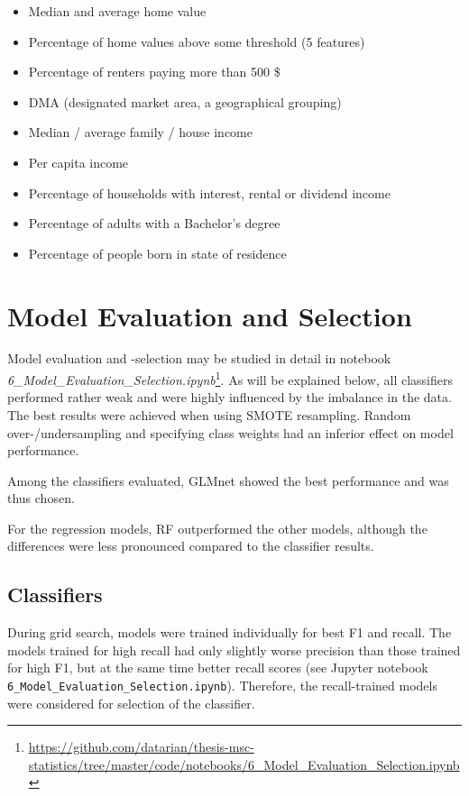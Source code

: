 \documentclass[
  11pt,
  a4paper,
  DIV=12,captions=tableheading,oneside,titlepage]{scrbook}
\providecommand{\tightlist}{%
  \setlength{\itemsep}{0pt}\setlength{\parskip}{0pt}}
\begin{document}
\begin{itemize}
\tightlist
\item
  Median and average home value
\item
  Percentage of home values above some threshold (5 features)
\item
  Percentage of renters paying more than 500 \$
\item
  DMA (designated market area, a geographical grouping)
\item
  Median / average family / house income
\item
  Per capita income
\item
  Percentage of households with interest, rental or dividend income
\item
  Percentage of adults with a Bachelor's degree
\item
  Percentage of people born in state of residence
\end{itemize}

\hypertarget{results-models}{%
\section{Model Evaluation and Selection}\label{results-models}}

Model evaluation and -selection may be studied in detail in notebook ~ \emph{6\_Model\_Evaluation\_Selection.ipynb}\footnote{\url{https://github.com/datarian/thesis-msc-statistics/tree/master/code/notebooks/6_Model_Evaluation_Selection.ipynb}}. As will be explained below, all classifiers performed rather weak and were highly influenced by the imbalance in the data. The best results were achieved when using SMOTE resampling. Random over-/undersampling and specifying class weights had an inferior effect on model performance.

Among the classifiers evaluated, GLMnet showed the best performance and was thus chosen.

For the regression models, RF outperformed the other models, although the differences were less pronounced compared to the classifier results.

\hypertarget{classifiers-1}{%
\subsection{Classifiers}\label{classifiers-1}}

During grid search, models were trained individually for best F1 and recall. The models trained for high recall had only slightly worse precision than those trained for high F1, but at the same time better recall scores (see Jupyter notebook \texttt{6\_Model\_Evaluation\_Selection.ipynb}). Therefore, the recall-trained models were considered for selection of the classifier.
\end{document}
